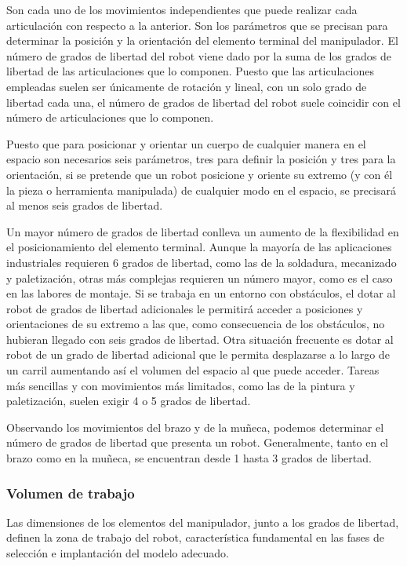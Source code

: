 \documentclass[12pt,a4paper]{report}
\begin{document}
Son cada uno de los movimientos independientes que
puede realizar cada articulación con respecto a la anterior. Son los
parámetros que se precisan para determinar la posición y la orientación del
elemento terminal del manipulador. El número de grados de libertad del robot
viene dado por la suma de los grados de libertad de las articulaciones que lo componen.
Puesto que las articulaciones empleadas suelen ser únicamente de rotación y
lineal, con un solo grado de libertad cada una, el número de grados de libertad del
robot suele coincidir con el número de articulaciones que lo componen. 

Puesto que para posicionar y orientar un cuerpo de cualquier manera en el
espacio son necesarios seis parámetros, tres para definir la posición y tres
para la orientación, si se pretende que un robot posicione y oriente su
extremo (y con él la pieza o herramienta manipulada) de cualquier modo en el
espacio, se precisará al menos seis grados de libertad.

Un mayor número de grados de libertad conlleva un aumento de la flexibilidad
en el posicionamiento del elemento terminal. Aunque la mayoría de las
aplicaciones industriales requieren 6 grados de libertad, como las de la soldadura,
mecanizado y paletización, otras más complejas requieren un número mayor,
como es el caso en las labores de montaje. Si se trabaja en un entorno con
obstáculos, el dotar al robot de grados de libertad adicionales le permitirá
acceder a posiciones y orientaciones de su extremo a las que, como
consecuencia de los obstáculos, no hubieran llegado con seis grados de
libertad. Otra situación frecuente es dotar al robot de un grado de libertad
adicional que le permita desplazarse a lo largo de un carril aumentando así
el volumen del espacio al que puede acceder. Tareas más sencillas y con
movimientos más limitados, como las de la pintura y paletización, suelen
exigir 4 o 5 grados de libertad.

Observando los movimientos del brazo y de la muñeca, podemos determinar el
número de grados de libertad que presenta un robot. Generalmente, tanto en
el brazo como en la muñeca, se encuentran desde 1 hasta 3 grados de libertad. 


\subsubsection{Volumen de trabajo}

Las dimensiones de los elementos del manipulador, junto a los grados de
libertad, definen la zona de trabajo del robot, característica fundamental en
las fases de selección e implantación del modelo adecuado.
\end{document}
